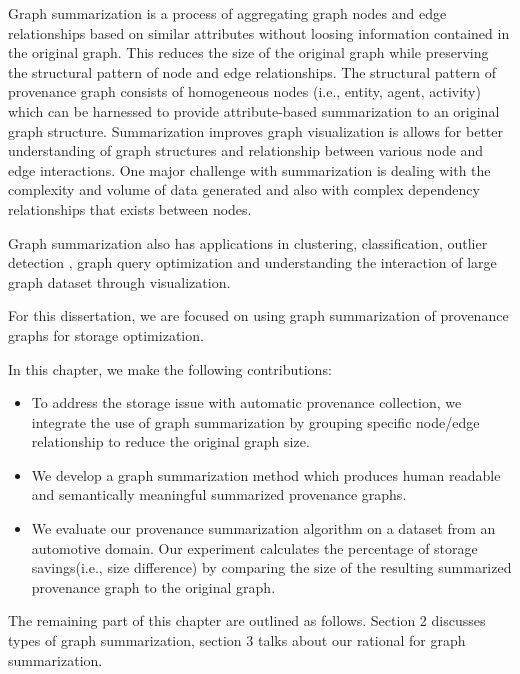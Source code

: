  
Graph summarization is a process of aggregating graph nodes and edge relationships based on similar attributes without loosing information contained in the original graph. This reduces the size of the original graph while preserving the structural pattern of node and edge relationships. The structural pattern of provenance graph consists of homogeneous nodes (i.e., entity, agent, activity) which can be harnessed to provide attribute-based summarization to an original graph structure. Summarization improves graph visualization is allows for better understanding of graph structures and relationship between various node and edge interactions. One major challenge with summarization is dealing with the complexity and volume of data generated and also with complex dependency relationships that exists between nodes.


Graph summarization also has applications in clustering, classification, outlier detection \cite{Smets2011TheOO}, graph query optimization and understanding the interaction of large graph dataset through visualization.

For this dissertation, we are focused on using graph summarization of provenance graphs for storage optimization.





In this chapter, we make the following contributions:

\begin{itemize}

\item To address the storage issue with automatic provenance collection, we integrate the use of graph summarization by grouping specific node/edge relationship to reduce the original graph size. 

\item We develop a graph summarization method which produces human readable and semantically meaningful summarized provenance graphs.

\item We evaluate our provenance summarization algorithm on a dataset from an automotive domain. Our experiment calculates the percentage of storage savings(i.e., size difference) by comparing the size of the resulting summarized provenance graph to the original graph.
\end{itemize}

 The remaining part of this chapter are outlined as follows. Section 2 discusses types of graph summarization, section 3 talks about our rational for graph summarization. 


